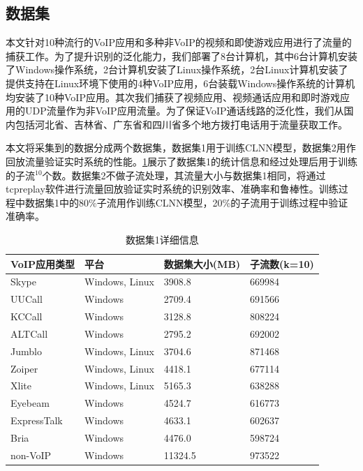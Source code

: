 \subsection{数据集}
本文针对10种流行的VoIP应用和多种非VoIP的视频和即使游戏应用进行了流量的捕获工作。为了提升识别的泛化能力，我们部署了8台计算机，其中6台计算机安装了Windows操作系统，2台计算机安装了Linux操作系统，2台Linux计算机安装了提供支持在Linux环境下使用的4种VoIP应用，6台装载Windows操作系统的计算机均安装了10种VoIP应用。其次我们捕获了视频应用、视频通话应用和即时游戏应用的UDP流量作为非VoIP应用流量。为了保证VoIP通话线路的泛化性，我们从国内包括河北省、吉林省、广东省和四川省多个地方拨打电话用于流量获取工作。

本文将采集到的数据分成两个数据集，数据集1用于训练CLNN模型，数据集2用作回放流量验证实时系统的性能。\ref{tab:traffic}展示了数据集1的统计信息和经过处理后用于训练的子流$^{10}$个数。数据集2不做子流处理，其流量大小与数据集1相同，将通过tcpreplay软件进行流量回放验证实时系统的识别效率、准确率和鲁棒性。训练过程中数据集1中的80\%子流用作训练CLNN模型，20\%的子流用于训练过程中验证准确率。

\begin{table}[htbp]
  \caption{数据集1详细信息}
  \label{tab:traffic}
  \centering
  \begin{tabular}{l l l l}
    \hline
    \textbf{VoIP应用类型} & \textbf{平台} & \textbf{数据集大小(MB)}& \textbf{子流数(k=10)}\\
    \hline
    Skype      & Windows, Linux  & 3908.8  &  669984  \\
    UUCall      & Windows  & 2709.4  &  691566  \\
    KCCall      & Windows  & 3128.8  &  808224  \\
    ALTCall      & Windows  & 2795.2  &  692002  \\
    Jumblo      & Windows, Linux  & 3704.6  &  871468  \\
    Zoiper      & Windows, Linux  & 4418.1  &  677114  \\
    Xlite      & Windows, Linux  & 5165.3  &  638288  \\
    Eyebeam      & Windows  & 4524.7  &  616773  \\
    ExpressTalk      & Windows  & 4633.1  &  602637  \\
    Bria      & Windows  & 4476.0  &  598724  \\
    non-VoIP      & Windows  & 11324.5  &  973522  \\
    \hline
  \end{tabular}
\end{table}

